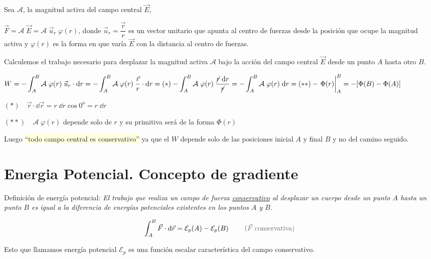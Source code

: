 Sea $\mathcal A$, la magnitud activa del campo central $\vec E$,

$\Vec F=\mathcal A \; \vec E= \mathcal A \; \vec u_r \; \varphi(r)$, donde $\vec u_r=\dfrac {\vec r}{r}$ es un vector unitario que apunta al centro de fuerzas desde la posición que ocupe la magnitud activa y $\varphi(r)$ es la forma en que varía $\vec E$ con la distancia al centro de fuerzas.

 Calculemos el trabajo necesario para desplazar la magnitud activa $\mathcal A$ bajo la acción del campo central $\vec E$ desde un punto $A$ hasta otro $B$.
 
 $\displaystyle W=-\int_A^B \mathcal A\; \varphi(r) \;\vec u_r \cdot \dd r= -\int_A^B \mathcal A\; \varphi(r) \; \dfrac {\vec r}{r} \cdot \dd r =(*) -\int_A^B \mathcal A\; \varphi(r) \; \dfrac {\cancel{r}\;\dd r}{\cancel{r}}=-\int_A^B \mathcal A\; \varphi(r)\; \dd r=(**)-\eval{\Phi(r)}_{A}^B=-[\Phi(B)-\Phi(A)]$
 
 \vspace{2mm}
 \textcolor{gris}{
 $(*)\quad \vec r\cdot \dd \vec r=r\;\dd r \cos 0^o=r\; \dd r $}
 
  \textcolor{gris}{
 $(**)\quad \mathcal A\; \varphi(r)$ depende solo de $r$ y su primitiva será de la forma $\Phi(r)$ }

Luego \colorbox{LightYellow}{``todo campo central es conservativo''} ya que el $W$ depende solo de las posiciones inicial $A$ y final $B$ y no del camino seguido.

\section{Energia Potencial. Concepto de gradiente}

 
\begin{miparrafo}
Definición de energía potencial: \emph{El trabajo que realiza un campo de fuerza \underline{conservativo} al desplazar un cuerpo desde un punto $A$ hasta un punto $B$ es igual a la diferencia de energías potenciales existentes en los puntos $A$ y $B$.}
\end{miparrafo}

\begin{equation}
\label{Ener-poten}
\int_A^B \vec F \cdot \dd \vec r = \mathcal E_p(A)- \mathcal E_p(B)\; \qquad \textcolor{gris}{(\vec F\; \text{conservativa})}	
\end{equation}

Esto que llamamos energía potencial $ \mathcal E_p$ es una función escalar característica del campo conservativo.

